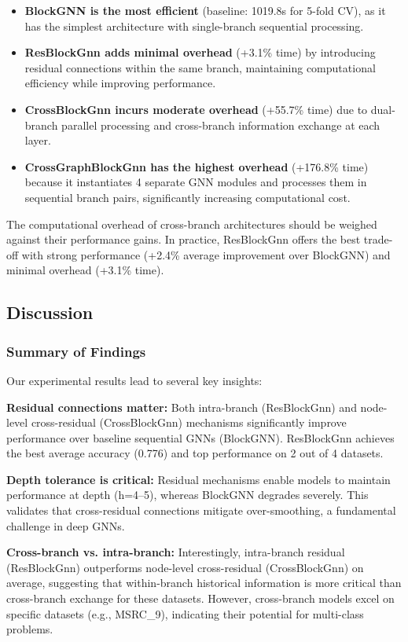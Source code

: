 \begin{itemize}
    \item \textbf{BlockGNN is the most efficient} (baseline: 1019.8s for 5-fold CV), as it has the simplest architecture with single-branch sequential processing.
    \item \textbf{ResBlockGnn adds minimal overhead} (+3.1\% time) by introducing residual connections within the same branch, maintaining computational efficiency while improving performance.
    \item \textbf{CrossBlockGnn incurs moderate overhead} (+55.7\% time) due to dual-branch parallel processing and cross-branch information exchange at each layer.
    \item \textbf{CrossGraphBlockGnn has the highest overhead} (+176.8\% time) because it instantiates 4 separate GNN modules and processes them in sequential branch pairs, significantly increasing computational cost.
\end{itemize}

The computational overhead of cross-branch architectures should be weighed against their performance gains. In practice, ResBlockGnn offers the best trade-off with strong performance (+2.4\% average improvement over BlockGNN) and minimal overhead (+3.1\% time).

\subsection{Discussion}

\subsubsection{Summary of Findings}

Our experimental results lead to several key insights:

\textbf{Residual connections matter:} Both intra-branch (ResBlockGnn) and node-level cross-residual (CrossBlockGnn) mechanisms significantly improve performance over baseline sequential GNNs (BlockGNN). ResBlockGnn achieves the best average accuracy (0.776) and top performance on 2 out of 4 datasets.

\textbf{Depth tolerance is critical:} Residual mechanisms enable models to maintain performance at depth (h=4--5), whereas BlockGNN degrades severely. This validates that cross-residual connections mitigate over-smoothing, a fundamental challenge in deep GNNs.

\textbf{Cross-branch vs. intra-branch:} Interestingly, intra-branch residual (ResBlockGnn) outperforms node-level cross-residual (CrossBlockGnn) on average, suggesting that within-branch historical information is more critical than cross-branch exchange for these datasets. However, cross-branch models excel on specific datasets (e.g., MSRC\_9), indicating their potential for multi-class problems.


